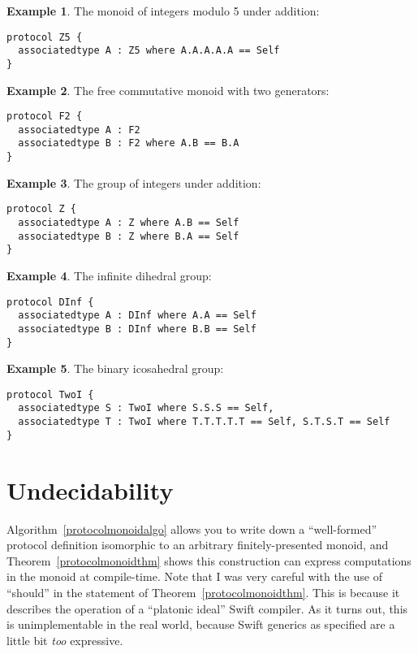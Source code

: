 \documentclass[headsepline,bibliography=totoc]{scrreport}
\theoremstyle{definition}
\newtheorem{example}{Example}[chapter]
\theoremstyle{definition}
\theoremstyle{definition}
\begin{document}
\begin{example}
The monoid of integers modulo 5 under addition:
\begin{Verbatim}
protocol Z5 {
  associatedtype A : Z5 where A.A.A.A.A == Self
}
\end{Verbatim}
\end{example}

\begin{example}
The free commutative monoid with two generators:
\begin{Verbatim}
protocol F2 {
  associatedtype A : F2
  associatedtype B : F2 where A.B == B.A
}
\end{Verbatim}
\end{example}

\begin{example}
The group of integers under addition:
\begin{Verbatim}
protocol Z {
  associatedtype A : Z where A.B == Self
  associatedtype B : Z where B.A == Self
}
\end{Verbatim}
\end{example}

\begin{example}
The infinite dihedral group:
\begin{Verbatim}
protocol DInf {
  associatedtype A : DInf where A.A == Self
  associatedtype B : DInf where B.B == Self
}
\end{Verbatim}
\end{example}
\begin{example}
The binary icosahedral group:
\begin{Verbatim}
protocol TwoI {
  associatedtype S : TwoI where S.S.S == Self,
  associatedtype T : TwoI where T.T.T.T.T == Self, S.T.S.T == Self
}
\end{Verbatim}
\end{example}
\section{Undecidability}
Algorithm~\ref{protocolmonoidalgo} allows you to write down a ``well-formed'' protocol definition isomorphic to an arbitrary finitely-presented monoid, and Theorem~\ref{protocolmonoidthm} shows this construction can express computations in the monoid at compile-time. Note that I was very careful with the use of ``should'' in the statement of Theorem~\ref{protocolmonoidthm}. This is because it describes the operation of a ``platonic ideal'' Swift compiler. As it turns out, this is unimplementable in the real world, because Swift generics as specified are a little bit \emph{too} expressive.
\end{document}
